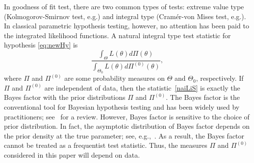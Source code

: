 \documentclass[11pt]{article}
\newcommand\CG[1]{\textcolor{red}{#1}}
\theoremstyle{plain}
\theoremstyle{definition}
\theoremstyle{remark}
\begin{document}
In goodness of fit test, there are two common types of tests: extreme value type (Kolmogorov-Smirnov test, e.g.) and integral type (Cram\'er-von Mises test, e.g.).
In classical parametric hypothesis testing, however, no attention has been paid to the integrated likelihood functions.
A natural integral type test statistic for hypothesis \eqref{eq:newHy} is
\begin{equation}\label{naiLiS}
\frac{\int_{\Theta}L(\theta) d\Pi(\theta)}{\int_{\Theta_0} L(\theta) d\Pi^{(0)}(\theta)},
\end{equation}
where $\Pi$ and $\Pi^{(0)}$ are some probability measures on $\Theta$ and $\Theta_{0}$, respectively.
If $\Pi$ and $\Pi^{(0)}$ are independent of data, then the statistic~\eqref{naiLiS} is exactly the Bayes factor \citep{scientificInference} with the prior distributions $\Pi$ and $\Pi^{(0)}$.
The Bayes factor is the conventional tool for Bayesian hypothesis testing and has been widely used by practitioners; see~\cite{Robert1995Bayes} for a review.
However, Bayes factor is sensitive to the choice of prior distribution. 
In fact, the asymptotic distribution of Bayes factor depends on the prior density at the true parameter; see, e.g.,~\cite{clarke1990information}.
As a result, the Bayes factor cannot be treated as a frequentist test statistic.
Thus, the measures $\Pi$ and $\Pi^{(0)}$ considered in this paper will depend on data.
\end{document}
